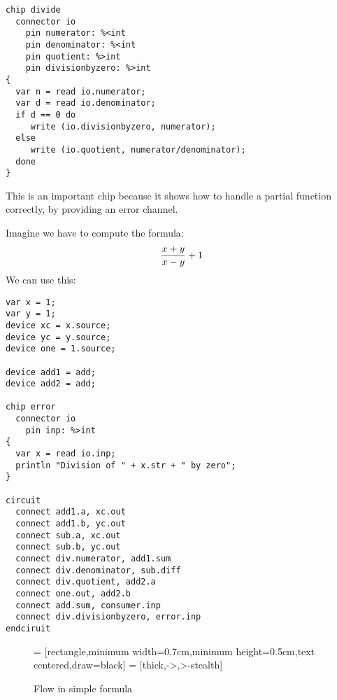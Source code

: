 \documentclass[oneside]{book}
\begin{document}
\begin{verbatim}
chip divide
  connector io
    pin numerator: %<int
    pin denominator: %<int
    pin quotient: %>int
    pin divisionbyzero: %>int
{
  var n = read io.numerator;
  var d = read io.denominator;
  if d == 0 do
     write (io.divisionbyzero, numerator);
  else
     write (io.quotient, numerator/denominator);
  done
}
\end{verbatim}

This is an important chip because it shows how to handle
a partial function correctly, by providing an error channel.

Imagine we have to compute the formula:
$${x + y\over x - y}+1$$
We can use this:

\begin{verbatim}
var x = 1;
var y = 1;
device xc = x.source;
device yc = y.source;
device one = 1.source;

device add1 = add;
device add2 = add;

chip error
  connector io
    pin inp: %>int
{
  var x = read io.inp;
  println "Division of " + x.str + " by zero";
}

circuit
  connect add1.a, xc.out
  connect add1.b, yc.out
  connect sub.a, xc.out
  connect sub.b, yc.out
  connect div.numerator, add1.sum
  connect div.denominator, sub.diff
  connect div.quotient, add2.a
  connect one.out, add2.b
  connect add.sum, consumer.inp 
  connect div.divisionbyzero, error.inp
endciruit
\end{verbatim}

\begin{figure}[h]
\begin{center}
 = [rectangle,minimum width=0.7cm,minimum height=0.5cm,text centered,draw=black]
 = [thick,->,>-stealth]
\caption{Flow in simple formula}
\label{fig:flowinsimpleformula}
\end{center}
\end{figure}
\end{document}
